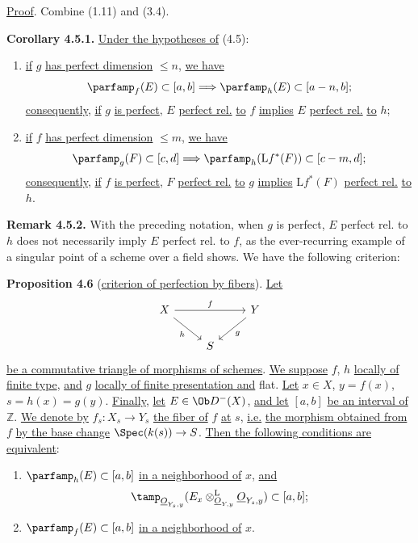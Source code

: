 \uline{Proof}. Combine (1.11) and (3.4).

\textbf{Corollary 4.5.1.} \uline{Under the hypotheses of} (4.5):
\begin{enumerate}[label=\alph*)]
\item \uline{if} \(g\) \uline{has perfect dimension} \(\leq n\), \uline{we have}
\[
 \parfamp_f(E)
 \subset[a,b]
 \Longrightarrow
 \parfamp_h(E)
 \subset[a-n,b];
\]
\uline{consequently}, \uline{if} \(g\) \uline{is perfect}, \(E\) \uline{perfect rel.} \uline{to} \(f\) \uline{implies} \(E\) \uline{perfect rel.} \uline{to} \(h\);
\item \uline{if} \(f\) \uline{has perfect dimension} \(\leq m\), \uline{we have}
\[
 \parfamp_g(F)
 \subset[c,d]
 \Longrightarrow
 \parfamp_h(\mathrm Lf^*(F))
 \subset[c-m,d];
\]
%
\uline{consequently}, \uline{if} \(f\) \uline{is perfect}, \(F\) \uline{perfect rel.} \uline{to} \(g\) \uline{implies} \(\mathrm Lf^*(F)\) \uline{perfect rel.} \uline{to} \(h\).
\end{enumerate}

\textbf{Remark 4.5.2.} With the preceding notation, when \(g\) is perfect, \(E\) perfect rel. to \(h\) does not necessarily imply \(E\) perfect rel. to \(f\), as the ever-recurring example of a singular point of a scheme over a field shows. We have the following criterion:

\textbf{Proposition 4.6} (\uline{criterion of perfection by fibers}). \uline{Let}
\[
\begin{tikzcd}
X \arrow[rr,"f"] \arrow[dr,"h"'] && Y \arrow[dl,"g"]\\
& S &
\end{tikzcd}
\]
\uline{be a commutative triangle of morphisms of schemes}. \uline{We suppose} \(f\), \(h\) \uline{locally of finite type}, \uline{and} \(g\) \uline{locally of finite presentation and} flat. \uline{Let} \(x\in X\), \(y=f(x)\), \(s=h(x)=g(y)\). \uline{Finally}, \uline{let} \(E\in\Ob D^-(X)\), \uline{and let} \([a,b]\) \uline{be an interval of} \(\mathbb Z\). \uline{We denote by} \(f_s:X_s\to Y_s\) \uline{the fiber of} \(f\) \uline{at} \(s\), \uline{i.e.} \uline{the morphism obtained from} \(f\) \uline{by the base change} \(\Spec(k(s))\to S\). \uline{Then the following conditions are equivalent}:
\begin{enumerate}[label=(\roman*)]
\item \(\parfamp_h(E)\subset[a,b]\) \uline{in a neighborhood of} \(x\), \uline{and}
\[
 \tamp_{\underline{O}_{Y_s,y}}(E_x\otimes_{\underline{O}_{Y,y}}^{\mathrm L}\underline{O}_{Y_s,y})
 \subset[a,b];
\]
\item \(\parfamp_f(E)\subset[a,b]\) \uline{in a neighborhood of} \(x\).
\end{enumerate}

